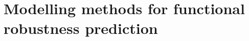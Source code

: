 \chapter{Modelling methods for functional robustness prediction}

\label{sec:methods-operating-esd-analysis}



%
